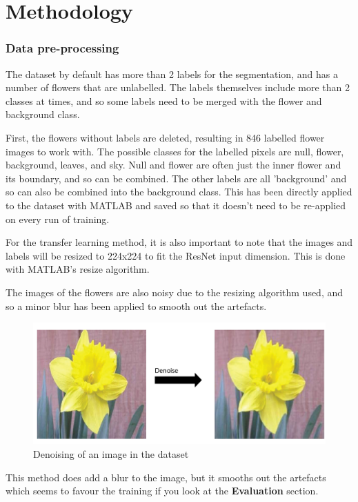 \documentclass{article}
\begin{document}
\section{Methodology}


\subsubsection{Data pre-processing}

The dataset by default has more than 2 labels for the segmentation, and has a number of flowers that are unlabelled. The labels themselves include more than 2 classes at times, and so some labels need to be merged with the flower and background class.

First, the flowers without labels are deleted, resulting in 846 labelled flower images to work with. The possible classes for the labelled pixels are null, flower, background, leaves, and sky. Null and flower are often just the inner flower and its boundary, and so can be combined. The other labels are all 'background' and so can also be combined into the background class. This has been directly applied to the dataset with MATLAB and saved so that it doesn't need to be re-applied on every run of training.

For the transfer learning method, it is also important to note that the images and labels will be resized to 224x224 to fit the ResNet input dimension. This is done with MATLAB's resize algorithm.

The images of the flowers are also noisy due to the resizing algorithm used, and so a minor blur has been applied to smooth out the artefacts. 

\begin{figure}[H]
    \centering
    \includegraphics[width=\linewidth]{denoise.png}
    \caption{Denoising of an image in the dataset}
    \label{fig:enter-label}
\end{figure}

This method does add a blur to the image, but it smooths out the artefacts which seems to favour the training if you look at the \textbf{Evaluation} section.
\end{document}
